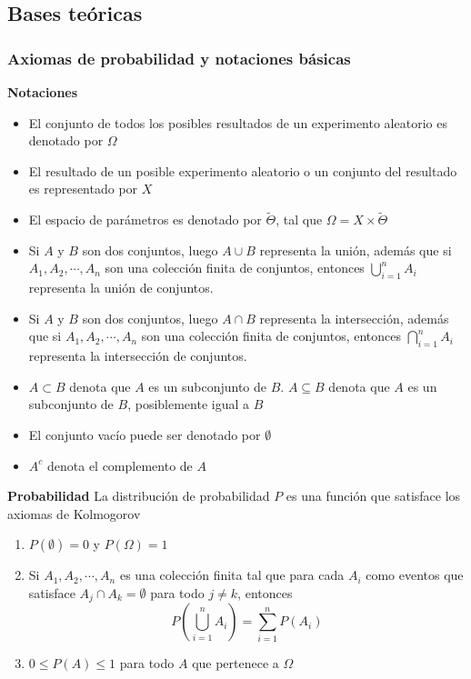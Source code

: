 \subsection{Bases teóricas}
\subsubsection{Axiomas de probabilidad y notaciones básicas}

\begin{defi}
    \textbf{Notaciones} \cite{koski2011bayesian}
    \begin{itemize}
        \item El conjunto de todos los posibles resultados de un experimento aleatorio es denotado por $\Omega$
        \item El resultado de un posible experimento aleatorio o un conjunto del resultado es representado por $X$
        \item El espacio de parámetros es denotado por $\tilde{\Theta}$, tal que $\Omega = X \times \tilde{\Theta}$
        \item Si $A$ y $B$ son dos conjuntos, luego $A \cup B$ representa la unión, además que si ${A}_{1},{A}_{2},\cdots,{A}_{n}$ son una colección finita de conjuntos, entonces $\bigcup_{i=1}^{n} {A}_{i}$ representa la unión de conjuntos.
        \item Si $A$ y $B$ son dos conjuntos, luego $A \cap B$ representa la intersección, además que si ${A}_{1},{A}_{2},\cdots,{A}_{n}$ son una colección finita de conjuntos, entonces $\bigcap_{i=1}^{n} {A}_{i}$ representa la intersección de conjuntos.
        \item $A \subset B$ denota que $A$ es un subconjunto de $B$. $A \subseteq B$ denota que $A$ es un subconjunto de $B$, posiblemente igual a $B$
        \item El conjunto vacío puede ser denotado por $\emptyset$
        \item ${A}^{c}$ denota el complemento de $A$ 
    \end{itemize}
\end{defi}

\begin{defi}
    \textbf{Probabilidad} \cite{koski2011bayesian}
    La distribución de probabilidad $P$ es una función que satisface los axiomas de Kolmogorov
    \begin{enumerate}
        \item $P(\emptyset) = 0$ y $P(\Omega) = 1$
        \item Si ${A}_{1},{A}_{2},\cdots,{A}_{n}$ es una colección finita tal que para cada $A_i$ como eventos que satisface ${A}_{j} \cap {A}_{k} = \emptyset$ para todo $j \neq k$, entonces
        $$P(\bigcup_{i=1}^{n} {A}_{i})=\sum\limits_{i = 1}^{n}P(A_i)$$ 
        \item $0 \leq P(A) \leq 1$ para todo $A$ que pertenece a $\Omega$
    \end{enumerate}
\end{defi}

